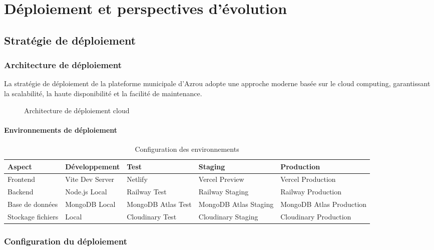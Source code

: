 \chapter{Déploiement et perspectives d'évolution}

\section{Stratégie de déploiement}

\subsection{Architecture de déploiement}

La stratégie de déploiement de la plateforme municipale d'Azrou adopte une approche moderne basée sur le cloud computing, garantissant la scalabilité, la haute disponibilité et la facilité de maintenance.

\begin{figure}[H]
\centering
\caption{Architecture de déploiement cloud}
\label{fig:architecture-deploiement}
\end{figure}

\subsubsection{Environnements de déploiement}

\begin{table}[H]
\centering
\caption{Configuration des environnements}
\begin{tabular}{|l|p{3cm}|p{3cm}|p{3cm}|p{3cm}|}
\hline
\textbf{Aspect} & \textbf{Développement} & \textbf{Test} & \textbf{Staging} & \textbf{Production} \\
\hline
Frontend & Vite Dev Server & Netlify & Vercel Preview & Vercel Production \\
Backend & Node.js Local & Railway Test & Railway Staging & Railway Production \\
Base de données & MongoDB Local & MongoDB Atlas Test & MongoDB Atlas Staging & MongoDB Atlas Production \\
Stockage fichiers & Local & Cloudinary Test & Cloudinary Staging & Cloudinary Production \\
\hline
\end{tabular}
\end{table}

\subsection{Configuration du déploiement}

